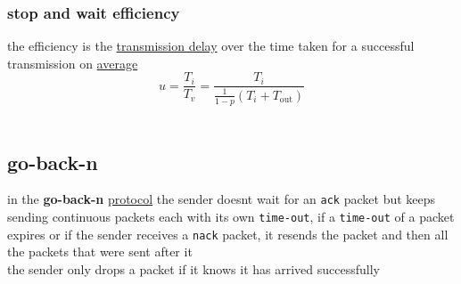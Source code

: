 \documentclass[a4paper,12pt]{article}
\begin{document}
\subsubsection{stop and wait efficiency}
\label{sec:orge9120a8}
the efficiency is the \hyperref[sec:org840ebaa]{transmission delay} over the time taken for a successful transmission on \href{20220813152209-average.org}{average}\\
\[
u = \frac{T_i}{T_v} = \frac{T_i}{\frac{1}{1-p}(T_i+T_\text{out})}
\]\\
\subsection{go-back-n}
\label{sec:org72dc15c}
in the \textbf{go-back-n} \hyperref[sec:org040283e]{protocol} the sender doesnt wait for an \texttt{ack} packet but keeps sending continuous packets each with its own \texttt{time-out}, if a \texttt{time-out} of a packet expires or if the sender receives a \texttt{nack} packet, it resends the packet and then all the packets that were sent after it\\
the sender only drops a packet if it knows it has arrived successfully\\
\end{document}
